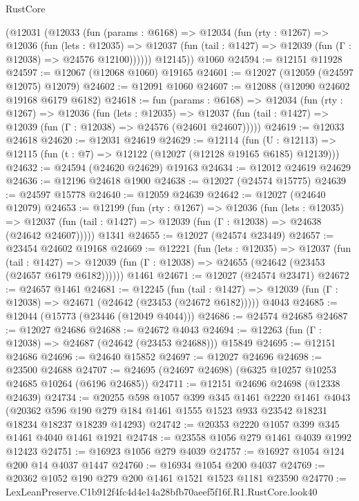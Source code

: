 \begin{lexlean}{RustCore}
\begin{coremodule}
      (@12031
        (@12033
          (fun (params : @6168) =>
          @12034
            (fun (rty : @1267) =>
            @12036
              (fun (lets : @12035) =>
              @12037 (fun (tail : @1427) => @12039 (fun (Γ : @12038) => @24576 @12100))))))
        @12145))
    @1060
@24594 := @12151 @11928
@24597 := @12067 (@12068 @1060) @19165
@24601 := @12027 (@12059 (@24597 @12075) @12079)
@24602 := @12091 @1060
@24607 := @12088 (@12090 @24602 @19168 @6179 @6182)
@24618 := fun (params : @6168) =>
  @12034
    (fun (rty : @1267) =>
    @12036
      (fun (lets : @12035) =>
      @12037 (fun (tail : @1427) => @12039 (fun (Γ : @12038) => @24576 (@24601 @24607)))))
@24619 := @12033 @24618
@24620 := @12031 @24619
@24629 := @12114
    (fun (U : @12113) => @12115 (fun (t : @7) => @12122 (@12027 (@12128 @19165 @6185) @12139)))
@24632 := @24594 (@24620 @24629) @19163
@24634 := @12012 @24619 @24629
@24636 := @12196 @24618 @1900
@24638 := @12027 (@24574 @15775)
@24639 := @24597 @15778
@24640 := @12059 @24639
@24642 := @12027 (@24640 @12079)
@24653 := @12199
    (fun (rty : @1267) =>
    @12036
      (fun (lets : @12035) =>
      @12037 (fun (tail : @1427) => @12039 (fun (Γ : @12038) => @24638 (@24642 @24607)))))
    @1341
@24655 := @12027 (@24574 @23449)
@24657 := @23454 @24602 @19168
@24669 := @12221
    (fun (lets : @12035) =>
    @12037
      (fun (tail : @1427) =>
      @12039 (fun (Γ : @12038) => @24655 (@24642 (@23453 (@24657 @6179 @6182))))))
    @1461
@24671 := @12027 (@24574 @23471)
@24672 := @24657 @1461
@24681 := @12245
    (fun (tail : @1427) => @12039 (fun (Γ : @12038) => @24671 (@24642 (@23453 (@24672 @6182)))))
    @4043
@24685 := @12044 (@15773 (@23446 (@12049 @4044)))
@24686 := @24574 @24685
@24687 := @12027 @24686
@24688 := @24672 @4043
@24694 := @12263 (fun (Γ : @12038) => @24687 (@24642 (@23453 @24688))) @15849
@24695 := @12151 @24686
@24696 := @24640 @15852
@24697 := @12027 @24696
@24698 := @23500 @24688
@24707 := @24695 (@24697 @24698) (@6325 @10257 @10253 @24685 @10264 (@6196 @24685))
@24711 := @12151 @24696 @24698 (@12338 @24639)
@24734 := @20255
    @598
    @1057
    @399
    @345
    @1461
    @2220
    @1461
    @4043
    (@20362 @596 @190 @279 @184 @1461 @1555 @1523 @933 @23542 @18231 @18234 @18237 @18239 @14293)
@24742 := @20353 @2220 @1057 @399 @345 @1461 @4040 @1461 @1921
@24748 := @23558 @1056 @279 @1461 @4039 @1992 @12423
@24751 := @16923 @1056 @279 @4039
@24757 := @16927 @1054 @124 @200 @14 @4037 @1447
@24760 := @16934 @1054 @200 @4037
@24769 := @20362 @1052 @190 @279 @200 @1461 @1521 @1523 @1181 @23590
@24770 := LexLeanPreserve.C1b912f4fc4d4e14a28bfb70aeef5f16f.R1.RustCore.look40

\end{coremodule}
\end{lexlean}
